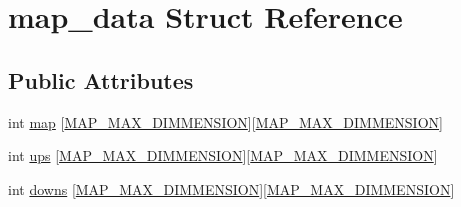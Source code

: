 \hypertarget{structmap__data}{\section{map\-\_\-data Struct Reference}
\label{structmap__data}
}
\subsection*{Public Attributes}
\begin{DoxyCompactItemize}
\item 
int \hyperlink{structmap__data_a0170274f605ffb6e847e6e66f1c88b11}{map} \mbox{[}\hyperlink{edit_8cpp_aa134845a275f6de3bc367bc29764f571}{M\-A\-P\-\_\-\-M\-A\-X\-\_\-\-D\-I\-M\-M\-E\-N\-S\-I\-O\-N}\mbox{]}\mbox{[}\hyperlink{edit_8cpp_aa134845a275f6de3bc367bc29764f571}{M\-A\-P\-\_\-\-M\-A\-X\-\_\-\-D\-I\-M\-M\-E\-N\-S\-I\-O\-N}\mbox{]}
\item 
int \hyperlink{structmap__data_a94a5e51d7057378e683988bb082a6dc2}{ups} \mbox{[}\hyperlink{edit_8cpp_aa134845a275f6de3bc367bc29764f571}{M\-A\-P\-\_\-\-M\-A\-X\-\_\-\-D\-I\-M\-M\-E\-N\-S\-I\-O\-N}\mbox{]}\mbox{[}\hyperlink{edit_8cpp_aa134845a275f6de3bc367bc29764f571}{M\-A\-P\-\_\-\-M\-A\-X\-\_\-\-D\-I\-M\-M\-E\-N\-S\-I\-O\-N}\mbox{]}
\item 
int \hyperlink{structmap__data_a7e93f0db5466398f6f4efd84051ce303}{downs} \mbox{[}\hyperlink{edit_8cpp_aa134845a275f6de3bc367bc29764f571}{M\-A\-P\-\_\-\-M\-A\-X\-\_\-\-D\-I\-M\-M\-E\-N\-S\-I\-O\-N}\mbox{]}\mbox{[}\hyperlink{edit_8cpp_aa134845a275f6de3bc367bc29764f571}{M\-A\-P\-\_\-\-M\-A\-X\-\_\-\-D\-I\-M\-M\-E\-N\-S\-I\-O\-N}\mbox{]}
\end{DoxyCompactItemize}


